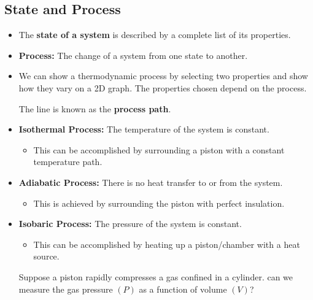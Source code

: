 \subsection{State and Process}
\begin{itemize}
    \item The \textbf{state of a system} is described by a complete list of its properties. 
    \item \textbf{Process:} The change of a system from one state to another.
    \item We can show a thermodynamic process by selecting two properties and show how they vary on a 2D graph. The properties chosen depend on the process.
    \begin{center}
    \end{center}
    The line is known as the \textbf{process path}.
    \item \textbf{Isothermal Process:} The temperature of the system is constant.
    \begin{itemize}
        \item This can be accomplished by surrounding a piston with a constant temperature path.
    \end{itemize}
    \item \textbf{Adiabatic Process:} There is no heat transfer to or from the system.
    \begin{itemize}
        \item This is achieved by surrounding the piston with perfect insulation.
    \end{itemize}
    \item \textbf{Isobaric Process:} The pressure of the system is constant.
    \begin{itemize}
        \item This can be accomplished by heating up a piston/chamber with a heat source.
    \end{itemize}
    \begin{idea}
        Suppose a piston rapidly compresses a gas confined in a cylinder. can we measure the gas pressure $(P)$ as a function of volume $(V)$?
        \vspace{2mm}


\end{idea}
\end{itemize}
